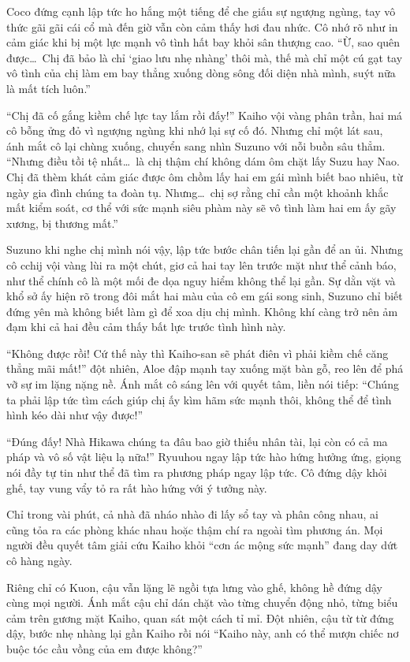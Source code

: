 ﻿\documentclass[../main.tex]{subfiles}
\begin{document}
Coco đứng cạnh lập tức ho hắng một tiếng để che giấu sự ngượng ngùng, tay vô thức gãi gãi cái cổ mà đến giờ vẫn còn cảm thấy hơi đau nhức. Cô nhớ rõ như in cảm giác khi bị một lực mạnh vô tình hất bay khỏi sân thượng cao. ``Ừ, sao quên được\dots\ Chị đã bảo là chỉ `giao lưu nhẹ nhàng' thôi mà, thế mà chỉ một cú gạt tay vô tình của chị làm em bay thẳng xuống dòng sông đối diện nhà mình, suýt nữa là mất tích luôn.''

``Chị đã cố gắng kiềm chế lực tay lắm rồi đấy!'' Kaiho vội vàng phân trần, hai má cô bỗng ửng đỏ vì ngượng ngùng khi nhớ lại sự cố đó. Nhưng chỉ một lát sau, ánh mắt cô lại chùng xuống, chuyển sang nhìn Suzuno với nỗi buồn sâu thẳm. ``Nhưng điều tồi tệ nhất\dots\ là chị thậm chí không dám ôm chặt lấy Suzu hay Nao. Chị đã thèm khát cảm giác được ôm chồm lấy hai em gái mình biết bao nhiêu, từ ngày gia đình chúng ta đoàn tụ. Nhưng\dots\ chị sợ rằng chỉ cần một khoảnh khắc mất kiểm soát, cơ thể với sức mạnh siêu phàm này sẽ vô tình làm hai em ấy gãy xương, bị thương mất.''

Suzuno khi nghe chị mình nói vậy, lập tức bước chân tiến lại gần để an ủi. Nhưng cô cchij vội vàng lùi ra một chút, giơ cả hai tay lên trước mặt như thể cảnh báo, như thể chính cô là một mối đe dọa nguy hiểm không thể lại gần. Sự dằn vặt và khổ sở ấy hiện rõ trong đôi mắt hai màu của cô em gái song sinh, Suzuno chỉ biết đứng yên mà không biết làm gì để xoa dịu chị mình. Không khí càng trở nên ảm đạm khi cả hai đều cảm thấy bất lực trước tình hình này.

``Không được rồi! Cứ thế này thì Kaiho-san sẽ phát điên vì phải kiềm chế căng thẳng mãi mất!'' đột nhiên, Aloe đập mạnh tay xuống mặt bàn gỗ, reo lên để phá vỡ sự im lặng nặng nề. Ánh mắt cô sáng lên với quyết tâm, liền nói tiếp: ``Chúng ta phải lập tức tìm cách giúp chị ấy kìm hãm sức mạnh thôi, không thể để tình hình kéo dài như vậy được!''

``Đúng đấy! Nhà Hikawa chúng ta đâu bao giờ thiếu nhân tài, lại còn có cả ma pháp và vô số vật liệu lạ nữa!'' Ryuuhou ngay lập tức hào hứng hưởng ứng, giọng nói đầy tự tin như thể đã tìm ra phương pháp ngay lập tức. Cô đứng dậy khỏi ghế, tay vung vẩy tỏ ra rất hào hứng với ý tưởng này.

Chỉ trong vài phút, cả nhà đã nháo nhào đi lấy sổ tay và phân công nhau, ai cũng tỏa ra các phòng khác nhau hoặc thậm chí ra ngoài tìm phương án. Mọi người đều quyết tâm giải cứu Kaiho khỏi ``cơn ác mộng sức mạnh'' đang day dứt cô hàng ngày.

Riêng chỉ có Kuon, cậu vẫn lặng lẽ ngồi tựa lưng vào ghế, không hề đứng dậy cùng mọi người. Ánh mắt cậu chỉ dán chặt vào từng chuyển động nhỏ, từng biểu cảm trên gương mặt Kaiho, quan sát một cách tỉ mỉ. Đột nhiên, cậu từ từ đứng dậy, bước nhẹ nhàng lại gần Kaiho rồi nói ``Kaiho này, anh có thể mượn chiếc nơ buộc tóc cầu vồng của em được không?''
\end{document}

